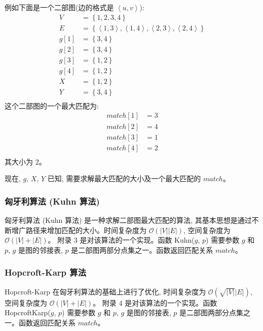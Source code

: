 例如下面是一个二部图(边的格式是 $\left<u, v\right>$): 
$$
\begin{aligned}
	V &= \left\{1, 2, 3, 4\right\} \\
	E &= \left\{\left<1, 3\right>, \left<1, 4\right>, \left<2, 3\right>, \left<2, 4\right>\right\} \\
	g[1] &= \left\{3, 4\right\} \\
	g[2] &= \left\{3, 4\right\} \\
	g[3] &= \left\{1, 2\right\} \\
	g[4] &= \left\{1, 2\right\} \\
	X &= \left\{1, 2\right\} \\
	Y &= \left\{3, 4\right\} \\
\end{aligned}
$$
这个二部图的一个最大匹配为:
$$
\begin{aligned}
	match[1] &= 3 \\
	match[2] &= 4 \\
	match[3] &= 1 \\
	match[4] &= 2 \\
\end{aligned}
$$
其大小为 $2$。

现在, $g$, $X$, $Y$ 已知, 需要求解最大匹配的大小及一个最大匹配的 $match$。
\subsubsection{匈牙利算法 (Kuhn 算法)}
匈牙利算法 (Kuhn 算法) 是一种求解二部图最大匹配的算法, 其基本思想是通过不断增广路径来增加匹配的大小。时间复杂度为 $\mathcal{O}(\left|V\right|\left|E\right|)$, 空间复杂度为 $\mathcal{O}(\left|V\right| + \left|E\right|)$。
附录 3 是对该算法的一个实现。函数 Kuhn($g$, $p$) 需要参数 $g$ 和 $p$, $g$ 是图的邻接表, $p$ 是二部图两部分点集之一。函数返回匹配关系 $match$。
\subsubsection{Hopcroft-Karp 算法}
Hopcroft-Karp 在匈牙利算法的基础上进行了优化, 时间复杂度为 $\mathcal{O}(\sqrt{\left|V\right|}\left|E\right|)$, 空间复杂度为 $\mathcal{O}(\left|V\right| + \left|E\right|)$。
附录 4 是对该算法的一个实现。函数 HopcroftKarp($g$, $p$) 需要参数 $g$ 和 $p$, $g$ 是图的邻接表, $p$ 是二部图两部分点集之一。函数返回匹配关系 $match$。
